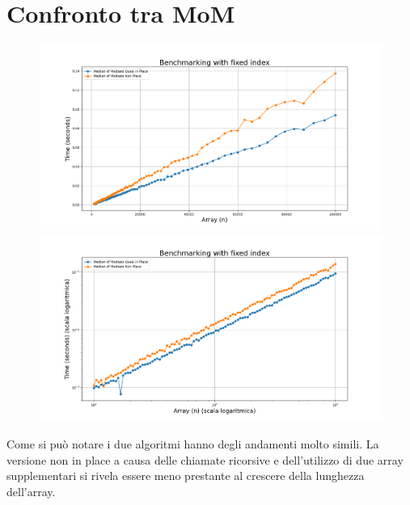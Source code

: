 \documentclass[a4paper]{article}
\begin{document}
\section{Confronto tra MoM}
\begin{figure}[h]
    \centering
    \includegraphics[width=.83\textwidth]{graphs/MoMs_n.png}
    \includegraphics[width=.83\textwidth]{graphs/MoMs_2xlog.png}
\end{figure}
Come si può notare i due algoritmi hanno degli andamenti molto simili. La versione non in place a causa delle chiamate ricorsive e dell'utilizzo di due array supplementari si rivela essere meno prestante al crescere della lunghezza dell'array.\\
\end{document}
